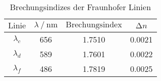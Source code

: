 \begin{table}[H]
  \centering
  \caption{Brechungsindizes der Fraunhofer Linien}
  \label{tab:tabe3}
    \begin{tabular}{c S S S}
    \toprule
    $ \text{Linie} $ & $ \lambda \: / \: \text{nm} $ & $ \text{Brechungsindex} $
    & $ \increment n$ \\
    \midrule
    $\lambda_{c}$ & 656 & 1.7510 & 0.0021 \\
    $\lambda_{d}$ & 589 & 1.7601 & 0.0022 \\
    $\lambda_{f}$ & 486 & 1.7819 & 0.0025 \\

          \bottomrule
    \end{tabular}
  \end{table}
